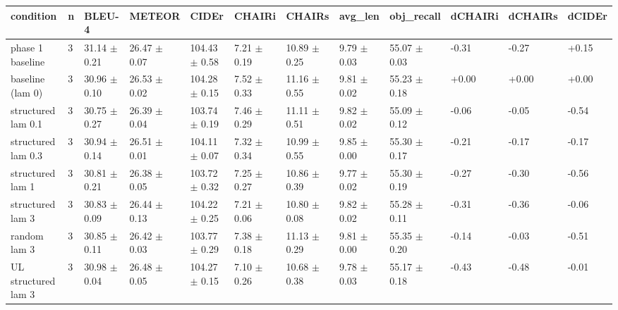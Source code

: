 \begin{tabular}{llllllllllll}
\hline
condition & n & BLEU-4 & METEOR & CIDEr & CHAIRi & CHAIRs & avg\_len & obj\_recall & dCHAIRi & dCHAIRs & dCIDEr \\
\hline
phase 1 baseline & 3 & 31.14 $\pm$ 0.21 & 26.47 $\pm$ 0.07 & 104.43 $\pm$ 0.58 & 7.21 $\pm$ 0.19 & 10.89 $\pm$ 0.25 & 9.79 $\pm$ 0.03 & 55.07 $\pm$ 0.03 & -0.31 & -0.27 & +0.15 \\
baseline (lam 0) & 3 & 30.96 $\pm$ 0.10 & 26.53 $\pm$ 0.02 & 104.28 $\pm$ 0.15 & 7.52 $\pm$ 0.33 & 11.16 $\pm$ 0.55 & 9.81 $\pm$ 0.02 & 55.23 $\pm$ 0.18 & +0.00 & +0.00 & +0.00 \\
structured lam 0.1 & 3 & 30.75 $\pm$ 0.27 & 26.39 $\pm$ 0.04 & 103.74 $\pm$ 0.19 & 7.46 $\pm$ 0.29 & 11.11 $\pm$ 0.51 & 9.82 $\pm$ 0.02 & 55.09 $\pm$ 0.12 & -0.06 & -0.05 & -0.54 \\
structured lam 0.3 & 3 & 30.94 $\pm$ 0.14 & 26.51 $\pm$ 0.01 & 104.11 $\pm$ 0.07 & 7.32 $\pm$ 0.34 & 10.99 $\pm$ 0.55 & 9.85 $\pm$ 0.00 & 55.30 $\pm$ 0.17 & -0.21 & -0.17 & -0.17 \\
structured lam 1 & 3 & 30.81 $\pm$ 0.21 & 26.38 $\pm$ 0.05 & 103.72 $\pm$ 0.32 & 7.25 $\pm$ 0.27 & 10.86 $\pm$ 0.39 & 9.77 $\pm$ 0.02 & 55.30 $\pm$ 0.19 & -0.27 & -0.30 & -0.56 \\
structured lam 3 & 3 & 30.83 $\pm$ 0.09 & 26.44 $\pm$ 0.13 & 104.22 $\pm$ 0.25 & 7.21 $\pm$ 0.06 & 10.80 $\pm$ 0.08 & 9.82 $\pm$ 0.02 & 55.28 $\pm$ 0.11 & -0.31 & -0.36 & -0.06 \\
random lam 3 & 3 & 30.85 $\pm$ 0.11 & 26.42 $\pm$ 0.03 & 103.77 $\pm$ 0.29 & 7.38 $\pm$ 0.18 & 11.13 $\pm$ 0.29 & 9.81 $\pm$ 0.00 & 55.35 $\pm$ 0.20 & -0.14 & -0.03 & -0.51 \\
UL structured lam 3 & 3 & 30.98 $\pm$ 0.04 & 26.48 $\pm$ 0.05 & 104.27 $\pm$ 0.15 & 7.10 $\pm$ 0.26 & 10.68 $\pm$ 0.38 & 9.78 $\pm$ 0.03 & 55.17 $\pm$ 0.18 & -0.43 & -0.48 & -0.01 \\
\hline
\end{tabular}
